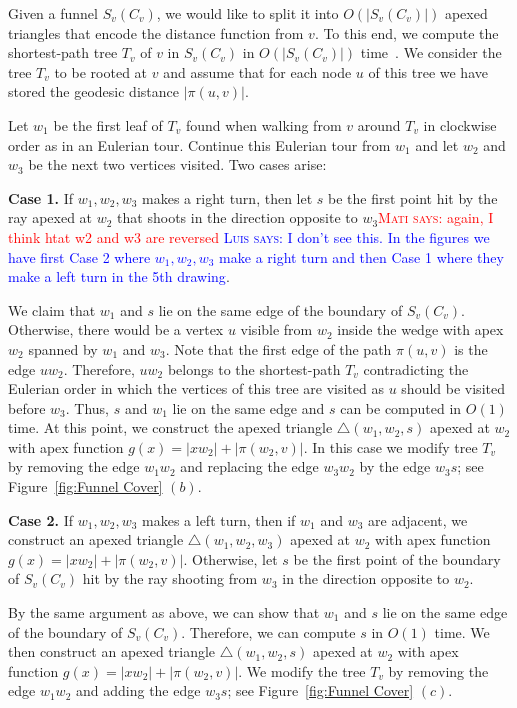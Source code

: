 \documentclass[a4paper,UKenglish]{lipics}
\newcommand{\fn}[2]{\ensuremath{S_{\scriptscriptstyle #1}(#2)}}
\newcommand{\g}[2]{\ensuremath{|\pi(#1, #2)|}}
\newcommand{\p}[2]{\ensuremath{\pi(#1, #2)}}
\newcommand{\marrow}{\marginpar[\hfill$\longrightarrow$]{$\longleftarrow$}}
\newcommand{\niceremark}[3]{\textcolor{red}{\textsc{#1 #2:} \marrow\textsf{#3}}}
\newcommand{\niceremarkblue}[3]{\textcolor{blue}{\textsc{#1 #2:} \marrow\textsf{#3}}}
\newcommand{\luis}[2][says]{\niceremarkblue{Luis}{#1}{#2}}
\newcommand{\mati}[2][says]{\niceremark{Mati}{#1}{#2}}
\begin{document}
Given a funnel $\fn{v}{C_v}$, we would like to split it into $O(|\fn{v}{C_v}|)$ apexed triangles that encode the distance function from $v$.
To this end, we compute the shortest-path tree $T_v$ of $v$ in $\fn{v}{C_v}$ in $O(|\fn{v}{C_v}|)$ time~\cite{guibasShortestPathQueries}.
We consider the tree $T_v$ to be rooted at $v$ and assume that for each node $u$ of this tree 
we have stored the geodesic distance $\g{u}{v}$. 

Let $w_1$ be the first leaf of $T_v$ found when walking from $v$ around $T_v$ in clockwise order as in an Eulerian tour.
Continue this Eulerian tour from $w_1$ and let $w_2$ and $w_3$ be the next two vertices visited. Two cases arise:

\textbf{Case 1.} If $w_1, w_2, w_3$ makes a right turn, then let $s$ be the first point hit by the ray apexed at $w_2$ that shoots in the direction opposite to $w_3$\mati{again, I think htat w2 and w3 are reversed} \luis{I don't see this. In the figures we have first Case 2 where $w_1,w_2,w_3$ make a right turn and then Case 1 where they make a left turn in the 5th drawing}. 

We claim that $w_1$ and $s$ lie on the same edge of the boundary of $\fn{v}{C_v}$. 
Otherwise, there would be a vertex $u$ visible from $w_2$ inside the wedge with apex $w_2$ spanned by $w_1$ and $w_3$.
Note that the first edge of the path $\p{u}{v}$ is the edge $uw_2$. Therefore, $uw_2$ belongs to the shortest-path $T_v$ contradicting the Eulerian order in which the vertices of this tree are visited as $u$ should be visited before $w_3$. Thus, $s$ and $w_1$ lie on the same edge and $s$ can be computed in $O(1)$ time.
At this point, we construct the apexed triangle $\triangle(w_1, w_2, s)$ apexed at $w_2$ with apex function $g(x) = |x w_2| + \g{w_2}{v}$.
In this case we modify tree $T_v$ by removing the edge $w_1w_2$ and replacing the edge $w_3w_2$ by the edge $w_3s$; see Figure~\ref{fig:Funnel Cover} $(b)$.


\textbf{Case 2.} If $w_1, w_2, w_3$ makes a left turn, then if $w_1$ and $w_3$ are adjacent, we construct an apexed triangle $\triangle(w_1, w_2, w_3)$ apexed at $w_2$ with apex function $g(x) = |x w_2| + \g{w_2}{v}$.
Otherwise, let $s$ be the first point of the boundary of $\fn{v}{C_v}$ hit by the ray shooting from $w_3$ in the direction opposite to $w_2$. 

By the same argument as above, we can show that $w_1$ and $s$ lie on the same edge of the boundary of $\fn{v}{C_v}$. Therefore, we can compute $s$ in $O(1)$ time. 
We then construct an apexed triangle $\triangle(w_1, w_2, s)$ apexed at $w_2$ with apex function $g(x) = |x w_2| + \g{w_2}{v}$.
We modify the tree $T_v$ by removing the edge $w_1w_2$ and adding the edge $w_3s$; see Figure~\ref{fig:Funnel Cover} $(c)$.
\end{document}
